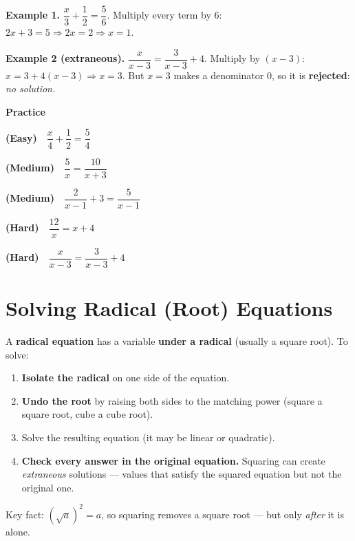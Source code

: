 \documentclass[11pt]{article}
\newcommand{\easy}{{\small\color{FangGreen}\textbf{(Easy)}}}
\newcommand{\med}{{\small\color{FangOrange}\textbf{(Medium)}}}
\newcommand{\hard}{{\small\color{FangAccent}\textbf{(Hard)}}}
\begin{document}
\begin{example}
\textbf{Example 1.} $\dfrac{x}{3} + \dfrac{1}{2} = \dfrac{5}{6}$. Multiply every term by $6$:
$2x + 3 = 5 \Rightarrow 2x = 2 \Rightarrow x = 1.$

\smallskip
\textbf{Example 2 (extraneous).} $\dfrac{x}{x-3} = \dfrac{3}{x-3} + 4$. Multiply by $(x-3)$:
$x = 3 + 4(x-3) \Rightarrow x = 3$. But $x=3$ makes a denominator $0$, so it is \textbf{rejected}:
\emph{no solution.}
\end{example}

\textbf{Practice}
\begin{practice}
  \item \easy\ \ $\dfrac{x}{4} + \dfrac{1}{2} = \dfrac{5}{4}$
  \item \med\ \ $\dfrac{5}{x} = \dfrac{10}{x+3}$
  \item \med\ \ $\dfrac{2}{x-1} + 3 = \dfrac{5}{x-1}$
  \item \hard\ \ $\dfrac{12}{x} = x + 4$
  \item \hard\ \ $\dfrac{x}{x-3} = \dfrac{3}{x-3} + 4$
\end{practice}

\section{Solving Radical (Root) Equations}

\begin{summary}
A \textbf{radical equation} has a variable \textbf{under a radical} (usually a square root). To solve:
\begin{enumerate}[leftmargin=1.5em,itemsep=1pt,topsep=2pt]
  \item \textbf{Isolate the radical} on one side of the equation.
  \item \textbf{Undo the root} by raising both sides to the matching power (square a square root, cube a cube root).
  \item Solve the resulting equation (it may be linear or quadratic).
  \item \textbf{Check every answer in the original equation.} Squaring can create \emph{extraneous}
        solutions --- values that satisfy the squared equation but not the original one.
\end{enumerate}
Key fact: $\left(\sqrt{a}\right)^{2} = a$, so squaring removes a square root --- but only \emph{after} it is alone.
\end{summary}
\end{document}
